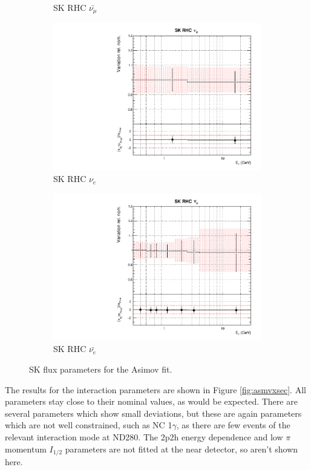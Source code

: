 \begin{figure}[!htbp]
\begin{subfigure}{0.45\textwidth}
  \caption{SK RHC $\bar{\nu_{\mu}}$}
\end{subfigure}
\begin{subfigure}{0.45\textwidth}
  \centering
  \includegraphics[width=0.75\linewidth]{figs/asmvfluxpoly14}
  \caption{SK RHC $\nu_{e}$}
\end{subfigure}
\begin{subfigure}{0.45\textwidth}
  \centering
  \includegraphics[width=0.75\linewidth]{figs/asmvfluxpoly15}
  \caption{SK RHC $\bar{\nu_e}$}
\end{subfigure}
\caption{SK flux parameters for the Asimov fit.}
\label{fig:asmvfluxSK}
\end{figure}

The results for the interaction parameters are shown in Figure \ref{fig:asmvxsec}. All parameters stay close to their nominal values, as would be expected. There are several parameters which show small deviations, but these are again parameters which are not well constrained, such as NC 1$\gamma$, as there are few events of the relevant interaction mode at ND280. The 2p2h energy dependence and low $\pi$ momentum $I_{1/2}$ parameters are not fitted at the near detector, so aren't shown here.


